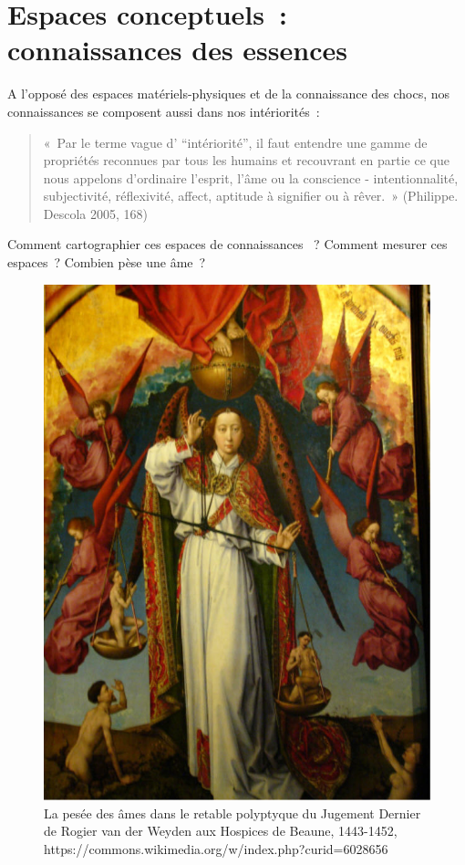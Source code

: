 \documentclass[
  letterpaper,
  DIV=11,
  numbers=noendperiod]{scrreprt}
\begin{document}
\hypertarget{sec-espaceConceptuels}{%
\section{Espaces conceptuels~: connaissances des
essences}\label{sec-espaceConceptuels}}

A l'opposé des espaces matériels-physiques et de la connaissance des
chocs, nos connaissances se composent aussi dans nos intériorités~:

\begin{quote}
«~Par le terme vague d' ``intériorité'', il faut entendre une gamme de
propriétés reconnues par tous les humains et recouvrant en partie ce que
nous appelons d'ordinaire l'esprit, l'âme ou la conscience -
intentionnalité, subjectivité, réflexivité, affect, aptitude à signifier
ou à rêver.~» (Philippe. Descola 2005, 168)
\end{quote}

Comment cartographier ces espaces de connaissances ~? Comment mesurer
ces espaces~? Combien pèse une âme~?

\begin{figure}

{\centering \includegraphics{media/100000000000026C0000033BDE0C2A2E5F4A6C07.jpg}

}

\caption{\label{fig-peseeAme}La pesée des âmes dans le retable
polyptyque du Jugement Dernier de Rogier van der Weyden aux Hospices de
Beaune, 1443-1452,
https://commons.wikimedia.org/w/index.php?curid=6028656}

\end{figure}
\end{document}
